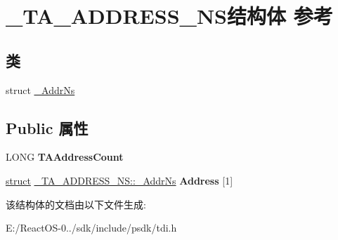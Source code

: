 \hypertarget{struct___t_a___a_d_d_r_e_s_s___n_s}{}\section{\+\_\+\+T\+A\+\_\+\+A\+D\+D\+R\+E\+S\+S\+\_\+\+N\+S结构体 参考}
\label{struct___t_a___a_d_d_r_e_s_s___n_s}
\subsection*{类}
\begin{DoxyCompactItemize}
\item 
struct \hyperlink{struct___t_a___a_d_d_r_e_s_s___n_s_1_1___addr_ns}{\+\_\+\+Addr\+Ns}
\end{DoxyCompactItemize}
\subsection*{Public 属性}
\begin{DoxyCompactItemize}
\item 
\mbox{\label{struct___t_a___a_d_d_r_e_s_s___n_s_aa9a4f0e3e15a48c9a9a73f3cf1a28fcd}} 
L\+O\+NG {\bfseries T\+A\+Address\+Count}
\item 
\mbox{\label{struct___t_a___a_d_d_r_e_s_s___n_s_abd366517587cd42d5222a64cb3816eab}} 
\hyperlink{interfacestruct}{struct} \hyperlink{struct___t_a___a_d_d_r_e_s_s___n_s_1_1___addr_ns}{\+\_\+\+T\+A\+\_\+\+A\+D\+D\+R\+E\+S\+S\+\_\+\+N\+S\+::\+\_\+\+Addr\+Ns} {\bfseries Address} \mbox{[}1\mbox{]}
\end{DoxyCompactItemize}


该结构体的文档由以下文件生成\+:\begin{DoxyCompactItemize}
\item 
E\+:/\+React\+O\+S-\/0../sdk/include/psdk/tdi.\+h\end{DoxyCompactItemize}
